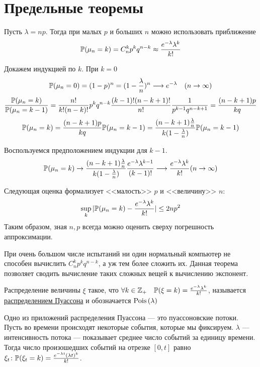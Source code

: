 \documentclass[../TV&MS.tex]{subfiles}
\begin{document}
    
\section{Предельные теоремы}

\begin{Th} [Пуассон]
Пусть $\lambda = np$. Тогда при малых $p$ и больших $n$ можно использовать приближение
$$\mathbb{P}(\mu_n = k) = C_n^kp^kq^{n-k} \approx \frac{e^{-\lambda}\lambda^k}{k!}$$
\end{Th}
\begin{Proof}
Докажем индукцией по $k$. При $k = 0$
$$\mathbb{P}(\mu_n = 0) = (1-p)^n = (1 - \frac{\lambda}{n})^n \longrightarrow e^{-\lambda} \quad (n \to \infty)$$
$$\frac{\mathbb{P}(\mu_n = k)}{\mathbb{P}(\mu_n = k-1)} = \frac{n!}{k!(n-k)!}p^kq^{n-k} \frac{(k-1)!(n-k+1)!}{n!} \frac{1}{p^{k-1}q^{n-k+1}} = \frac{(n-k+1)p}{kq}$$
$$\mathbb{P}(\mu_n = k) = \frac{(n-k+1)p}{kq}\mathbb{P}(\mu_n = k-1) = \frac{(n-k+1)\frac{\lambda}n}{k(1-\frac{\lambda}n)}\mathbb{P}(\mu_n = k-1)$$

Воспользуемся предположением индукции для $k-1$.
$$\mathbb{P}(\mu_n = k) \to \frac{(n-k+1)\frac{\lambda}n}{k(1-\frac{\lambda}n)} \frac{e^{-\lambda}\lambda^{k-1}}{(k-1)!} \longrightarrow \frac{e^{-\lambda}\lambda^{k}}{k!} (n \to \infty)$$
\end{Proof}

Следующая оценка формализует <<малость>> $p$ и <<величину>> $n$:
$$\sup\limits_k |\mathbb{P}(\mu_n = k) - \frac{e^{-\lambda}\lambda^k}{k!}| \le 2np^2$$
Таким образом, зная $n, p$ всегда можно оценить сверху погрешность аппроксимации.\\
\begin{Why}
При очень большом числе испытаний ни один нормальный компьютер не способен вычислить  $ C_n^kp^kq^{n-k}$, а уж тем более сложить их. Данная теорема позволяет сводить вычисление таких сложных вещей к вычислению экспонент.
\end{Why}

Распределение величины $\xi$ такое, что $\forall k \in \mathbb{Z}_+\quad  \mathbb{P}(\xi = k) =\frac{e^{-\lambda}\lambda^k}{k!}$, называется \underline{распределением Пуассона} 
и обозначается ${\rm Pois \,}(\lambda)$

Одно из приложений распределения Пуассона --- это пуассоновские потоки. Пусть во времени происходят некоторые события, которые мы фиксируем. $\lambda$ --- интенсивность потока --- показывает среднее число событий за единицу времени. Тогда число произошедших событий на отрезке $[0, t]$ равно $\xi_t\colon \mathbb{P}(\xi_t = k) = \frac{e^{-\lambda t}(\lambda t)^k}{k!}$.
\end{document}
